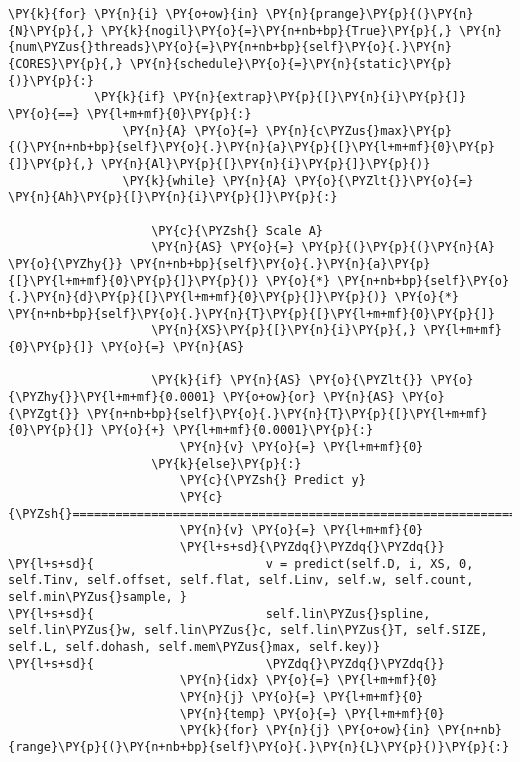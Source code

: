 \begin{Verbatim}[commandchars=\\\{\}]
        \PY{k}{for} \PY{n}{i} \PY{o+ow}{in} \PY{n}{prange}\PY{p}{(}\PY{n}{N}\PY{p}{,} \PY{k}{nogil}\PY{o}{=}\PY{n+nb+bp}{True}\PY{p}{,} \PY{n}{num\PYZus{}threads}\PY{o}{=}\PY{n+nb+bp}{self}\PY{o}{.}\PY{n}{CORES}\PY{p}{,} \PY{n}{schedule}\PY{o}{=}\PY{n}{static}\PY{p}{)}\PY{p}{:}
            \PY{k}{if} \PY{n}{extrap}\PY{p}{[}\PY{n}{i}\PY{p}{]} \PY{o}{==} \PY{l+m+mf}{0}\PY{p}{:}
                \PY{n}{A} \PY{o}{=} \PY{n}{c\PYZus{}max}\PY{p}{(}\PY{n+nb+bp}{self}\PY{o}{.}\PY{n}{a}\PY{p}{[}\PY{l+m+mf}{0}\PY{p}{]}\PY{p}{,} \PY{n}{Al}\PY{p}{[}\PY{n}{i}\PY{p}{]}\PY{p}{)}
                \PY{k}{while} \PY{n}{A} \PY{o}{\PYZlt{}}\PY{o}{=} \PY{n}{Ah}\PY{p}{[}\PY{n}{i}\PY{p}{]}\PY{p}{:}
                    
                    \PY{c}{\PYZsh{} Scale A}
                    \PY{n}{AS} \PY{o}{=} \PY{p}{(}\PY{p}{(}\PY{n}{A} \PY{o}{\PYZhy{}} \PY{n+nb+bp}{self}\PY{o}{.}\PY{n}{a}\PY{p}{[}\PY{l+m+mf}{0}\PY{p}{]}\PY{p}{)} \PY{o}{*} \PY{n+nb+bp}{self}\PY{o}{.}\PY{n}{d}\PY{p}{[}\PY{l+m+mf}{0}\PY{p}{]}\PY{p}{)} \PY{o}{*} \PY{n+nb+bp}{self}\PY{o}{.}\PY{n}{T}\PY{p}{[}\PY{l+m+mf}{0}\PY{p}{]}
                    \PY{n}{XS}\PY{p}{[}\PY{n}{i}\PY{p}{,} \PY{l+m+mf}{0}\PY{p}{]} \PY{o}{=} \PY{n}{AS} 
                    
                    \PY{k}{if} \PY{n}{AS} \PY{o}{\PYZlt{}} \PY{o}{\PYZhy{}}\PY{l+m+mf}{0.0001} \PY{o+ow}{or} \PY{n}{AS} \PY{o}{\PYZgt{}} \PY{n+nb+bp}{self}\PY{o}{.}\PY{n}{T}\PY{p}{[}\PY{l+m+mf}{0}\PY{p}{]} \PY{o}{+} \PY{l+m+mf}{0.0001}\PY{p}{:}
                        \PY{n}{v} \PY{o}{=} \PY{l+m+mf}{0}
                    \PY{k}{else}\PY{p}{:}
                        \PY{c}{\PYZsh{} Predict y}
                        \PY{c}{\PYZsh{}========================================================================}
                        \PY{n}{v} \PY{o}{=} \PY{l+m+mf}{0}
                        \PY{l+s+sd}{\PYZdq{}\PYZdq{}\PYZdq{}}
\PY{l+s+sd}{                        v = predict(self.D, i, XS, 0, self.Tinv, self.offset, self.flat, self.Linv, self.w, self.count, self.min\PYZus{}sample, }
\PY{l+s+sd}{                        self.lin\PYZus{}spline, self.lin\PYZus{}w, self.lin\PYZus{}c, self.lin\PYZus{}T, self.SIZE, self.L, self.dohash, self.mem\PYZus{}max, self.key)}
\PY{l+s+sd}{                        \PYZdq{}\PYZdq{}\PYZdq{}}
                        \PY{n}{idx} \PY{o}{=} \PY{l+m+mf}{0}
                        \PY{n}{j} \PY{o}{=} \PY{l+m+mf}{0}
                        \PY{n}{temp} \PY{o}{=} \PY{l+m+mf}{0}
                        \PY{k}{for} \PY{n}{j} \PY{o+ow}{in} \PY{n+nb}{range}\PY{p}{(}\PY{n+nb+bp}{self}\PY{o}{.}\PY{n}{L}\PY{p}{)}\PY{p}{:} 
                        

\end{Verbatim}
